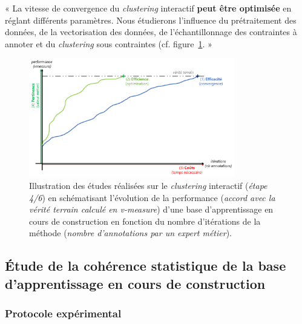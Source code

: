 		\begin{tcolorbox}[
			title=\textbf{Hypothèse de pertinence},
			colback=gray!20,
			colframe=gray!50!black!75,
			width=\linewidth
		]
			« La vitesse de convergence du \textit{clustering} interactif \textbf{peut être optimisée} en réglant différents paramètres. Nous étudierons l'influence du prétraitement des données, de la vectorisation des données, de l'échantillonnage des contraintes à annoter et du \textit{clustering} sous contraintes (cf. figure~\ref{figure:HYPOTHESE-PERTINENCE}. »
			
			
			\begin{figure}[H]
				\centering
				\includegraphics[width=0.8\textwidth]{figures/hypotheses-04-pertinence}
				\caption{Illustration des études réalisées sur le \textit{clustering} interactif (\textit{étape 4/6}) en schématisant l'évolution de la performance (\textit{accord avec la vérité terrain calculé en v-measure}) d'une base d'apprentissage en cours de construction en fonction du nombre d'itérations de la méthode (\textit{nombre d'annotations par un expert métier}).}
				\label{figure:HYPOTHESE-PERTINENCE}
			\end{figure}

		\end{tcolorbox}
		
		\subsection{Étude de la cohérence statistique de la base d'apprentissage en cours de construction}
		
			\subsubsection{Protocole expérimental}

